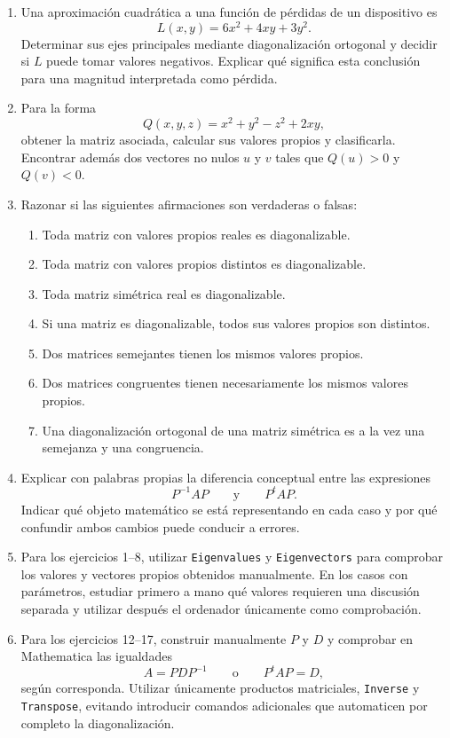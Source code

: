 \begin{enumerate}
\item Una aproximación cuadrática a una función de pérdidas de un dispositivo es
\[
L(x,y)=6x^2+4xy+3y^2.
\]
Determinar sus ejes principales mediante diagonalización ortogonal y decidir si $L$ puede tomar valores negativos. Explicar qué significa esta conclusión para una magnitud interpretada como pérdida.

\item Para la forma
\[
Q(x,y,z)=x^2+y^2-z^2+2xy,
\]
obtener la matriz asociada, calcular sus valores propios y clasificarla. Encontrar además dos vectores no nulos $u$ y $v$ tales que $Q(u)>0$ y $Q(v)<0$.

\item Razonar si las siguientes afirmaciones son verdaderas o falsas:
\begin{enumerate}[label=\alph*)]
\item Toda matriz con valores propios reales es diagonalizable.
\item Toda matriz con valores propios distintos es diagonalizable.
\item Toda matriz simétrica real es diagonalizable.
\item Si una matriz es diagonalizable, todos sus valores propios son distintos.
\item Dos matrices semejantes tienen los mismos valores propios.
\item Dos matrices congruentes tienen necesariamente los mismos valores propios.
\item Una diagonalización ortogonal de una matriz simétrica es a la vez una semejanza y una congruencia.
\end{enumerate}

\item Explicar con palabras propias la diferencia conceptual entre las expresiones
\[
P^{-1}AP
\qquad\text{y}\qquad
P^tAP.
\]
Indicar qué objeto matemático se está representando en cada caso y por qué confundir ambos cambios puede conducir a errores.

\item \M Para los ejercicios 1--8, utilizar \texttt{Eigenvalues} y \texttt{Eigenvectors} para comprobar los valores y vectores propios obtenidos manualmente. En los casos con parámetros, estudiar primero a mano qué valores requieren una discusión separada y utilizar después el ordenador únicamente como comprobación.

\item \M Para los ejercicios 12--17, construir manualmente $P$ y $D$ y comprobar en Mathematica las igualdades
\[
A=PDP^{-1}
\qquad\text{o}\qquad
P^tAP=D,
\]
según corresponda. Utilizar únicamente productos matriciales, \texttt{Inverse} y \texttt{Transpose}, evitando introducir comandos adicionales que automaticen por completo la diagonalización.


\end{enumerate}
